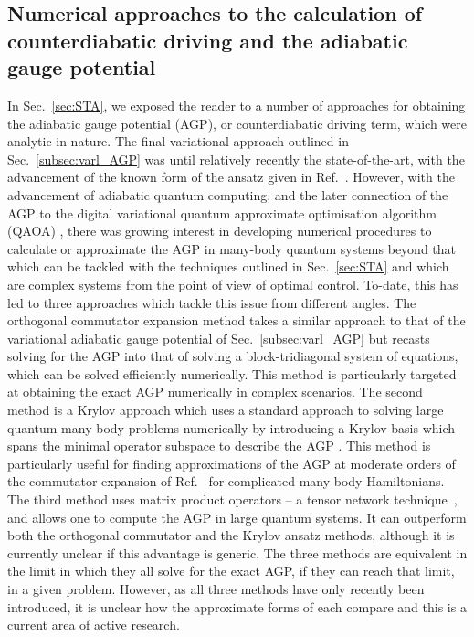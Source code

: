 \subsection{Numerical approaches to the calculation of counterdiabatic driving and the adiabatic gauge potential} \label{subsec:numagp}
In Sec.~\ref{sec:STA}, we exposed the reader to a number of approaches for obtaining the adiabatic gauge potential (AGP), or counterdiabatic driving term, which were analytic in nature. The final variational approach \cite{sels2017minimizing} outlined in Sec.~\ref{subsec:varl_AGP} was until relatively recently the state-of-the-art, with the advancement of the known form of the ansatz given in Ref.~\cite{Claeys2019Floquet}. However, with the advancement of adiabatic quantum computing, and the later connection of the AGP to the digital variational quantum approximate optimisation algorithm (QAOA) \cite{wurtz2022counterdiabaticity}, there was growing interest in developing numerical procedures to calculate or approximate the AGP in many-body quantum systems beyond that which can be tackled with the techniques outlined in Sec.~\ref{sec:STA} and which are complex systems from the point of view of optimal control. To-date, this has led to three approaches which tackle this issue from different angles. The orthogonal commutator expansion method \cite{lawrence2024numerical} takes a similar approach to that of the variational adiabatic gauge potential of Sec.~\ref{subsec:varl_AGP} but recasts solving for the AGP into that of solving a block-tridiagonal system of equations, which can be solved efficiently numerically. This method is particularly targeted at obtaining the exact AGP numerically in complex scenarios. The second method is a Krylov approach which uses a standard approach to solving large quantum many-body problems numerically by introducing a Krylov basis which spans the minimal operator subspace to describe the AGP \cite{Claeys2019Floquet, delCampoKrylovPRX}. This method is particularly useful for finding approximations of the AGP at moderate orders of the commutator expansion of Ref.~\cite{Claeys2019Floquet} for complicated many-body Hamiltonians. The third method uses matrix product operators -- a tensor network technique~\cite{kim2024variational,mckeever2024towards}, and allows one to compute the AGP in large quantum systems. It can outperform both the orthogonal commutator and the Krylov ansatz methods, although it is currently unclear if this advantage is generic. The three methods are equivalent in the limit in which they all solve for the exact AGP, if they can reach that limit, in a given problem. However, as all three methods have only recently been introduced, it is unclear how the approximate forms of each compare and this is a current area of active research.

